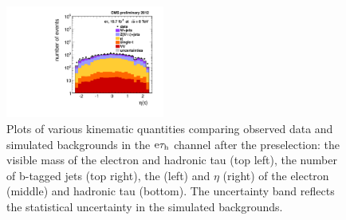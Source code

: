 \documentclass[12pt]{thesis}  %
\newcommand{\tauh}{\ensuremath{\tau_{\text{h}}}\xspace}
\newcommand{\Pe}{\ensuremath{\cmsSymbolFace{e}}\xspace}
\newcommand{\etau}{\ensuremath{\Pe\tauh}\xspace}
\begin{document}
\begin{figure}[hbtp]
\begin{center}
    \includegraphics[width=0.465\textwidth]{figures/etau/tauEtaMultJet.pdf}
    \caption{Plots of various kinematic quantities comparing observed data and simulated backgrounds in the \etau channel after the preselection: the visible mass of the electron and hadronic tau (top left), the number of b-tagged jets (top right), the \pt (left) and $\eta$ (right) of the electron (middle) and hadronic tau (bottom). The uncertainty band reflects the statistical uncertainty in the simulated backgrounds.}
    \label{fig:preseletau}
  \end{center}
\end{figure}
\end{document}
